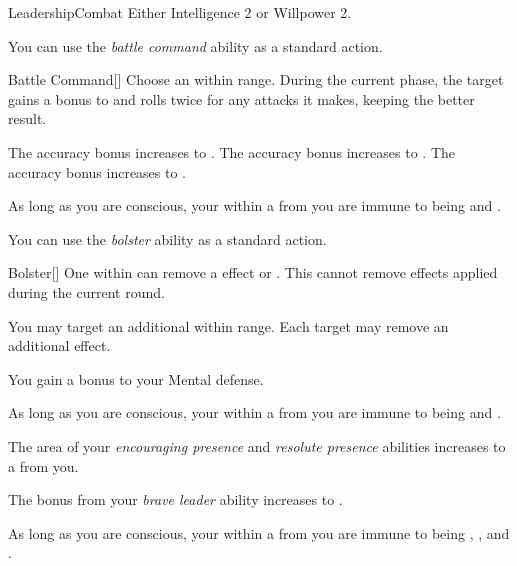     \begin{feat}{Leadership}{Combat}
        \featpre Either Intelligence 2 or Willpower 2.

         You can use the \textit{battle command} ability as a standard action.
        \begin{freeability}{Battle Command}[]
            Choose an  within \rngmed range.
            During the current phase, the target gains a  bonus to  and rolls twice for any attacks it makes, keeping the better result.

            \rankline
             The accuracy bonus increases to .
             The accuracy bonus increases to .
             The accuracy bonus increases to .
        \end{freeability}

         As long as you are conscious, your  within a \arealarge {} from you are immune to being \shaken and \frightened.

         You can use the \textit{bolster} ability as a standard action.
        \begin{freeability}{Bolster}[]
            One  within \medrange can remove a  effect or .
            This cannot remove effects applied during the current round.

            \rankline
             You may target an additional  within range.
             Each target may remove an additional effect.
        \end{freeability}

         You gain a  bonus to your Mental defense.

         As long as you are conscious, your  within a \arealarge {} from you are immune to being \dazed and \stunned.

         The area of your \textit{encouraging presence} and \textit{resolute presence} abilities increases to a \hugearea {} from you.

         The bonus from your \textit{brave leader} ability increases to .

         As long as you are conscious, your  within a \areahuge {} from you are immune to being \confused, \panicked, and \paralyzed.
    \end{feat}

